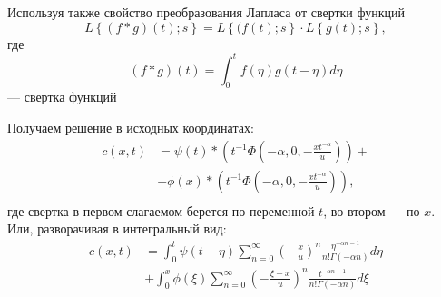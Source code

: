 Используя также свойство преобразования Лапласа от свертки функций
\begin{equation}
	L\left\{\left(f * g\right) \left(t\right); s \right\} = L\left\{(f\left(t\right); s\right\} \cdot L\left\{g\left(t\right); s\right\},
\end{equation}
где
\begin{equation}
	\left(f * g\right) \left(t\right) = \int_0^t f\left(\eta\right) g\left(t - \eta\right) d \eta
\end{equation}
--- свертка функций

Получаем решение в исходных координатах:
\begin{equation}
	\begin{split}
		c(x,t) & = \psi(t) * \left(t^{-1} \Phi \left(-\alpha, 0, -\frac{xt^{-\alpha}}{u}\right) \right) + \\
		& + \phi(x) * \left(t^{-1} \Phi\left(-\alpha, 0, -\frac{xt^{-\alpha}}{u}\right) \right),\\
	\end{split}
\end{equation}
где свертка в первом слагаемом берется по переменной $t$, во втором --- по $x$. Или, разворачивая в интегральный вид:
\begin{equation}
	\begin{split}
		c(x,t) & = \int_{0}^{t} \psi(t - \eta) \sum_{n=0}^\infty\left(-\frac{x}{u}\right)^n \frac{\eta^{-\alpha n - 1}}{n!\Gamma(-\alpha n)} d \eta\\
		& + \int_0^x \phi(\xi) \sum_{n=0}^\infty\left(-\frac{\xi-x}{u}\right)^n \frac{t^{-\alpha n - 1}}{n!\Gamma(-\alpha n)} d \xi\\
	\end{split}
\end{equation}
